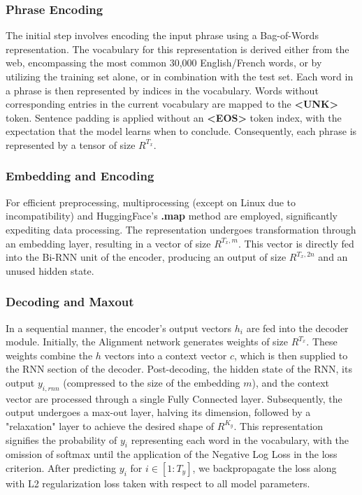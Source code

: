 \subsubsection{Phrase Encoding}

The initial step involves encoding the input phrase using a Bag-of-Words representation. The vocabulary for this representation is derived either from the web, encompassing the most common 30,000 English/French words, or by utilizing the training set alone, or in combination with the test set. Each word in a phrase is then represented by indices in the vocabulary. Words without corresponding entries in the current vocabulary are mapped to the \textbf{\textless UNK\textgreater} token. Sentence padding is applied without an \textbf{\textless EOS\textgreater} token index, with the expectation that the model learns when to conclude. Consequently, each phrase is represented by a tensor of size $R^{T_x}$.

\subsubsection{Embedding and Encoding}

For efficient preprocessing, multiprocessing (except on Linux due to incompatibility) and HuggingFace's \textbf{.map} method are employed, significantly expediting data processing. The representation undergoes transformation through an embedding layer, resulting in a vector of size $R^{T_x,m}$. This vector is directly fed into the Bi-RNN unit of the encoder, producing an output of size $R^{T_x,2n}$ and an unused hidden state.

\subsubsection{Decoding and Maxout}

In a sequential manner, the encoder's output vectors $h_i$ are fed into the decoder module. Initially, the Alignment network generates weights of size $R^{T_x}$. These weights combine the $h$ vectors into a context vector $c$, which is then supplied to the RNN section of the decoder. Post-decoding, the hidden state of the RNN, its output $y_{i,rnn}$ (compressed to the size of the embedding $m$), and the context vector are processed through a single Fully Connected layer. Subsequently, the output undergoes a max-out layer, halving its dimension, followed by a "relaxation" layer to achieve the desired shape of $R^{K_y}$. This representation signifies the probability of $y_i$ representing each word in the vocabulary, with the omission of softmax until the application of the Negative Log Loss in the loss criterion. After predicting $y_i$ for $i \in [1:T_y]$, we backpropagate the loss along with L2 regularization loss taken with respect to all model parameters.

